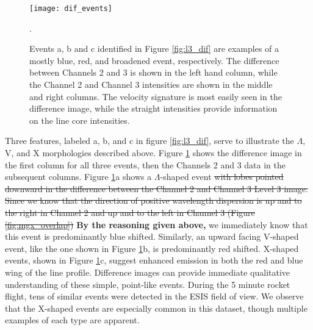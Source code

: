    	
 		\begin{figure}
  			\centering
  			\texttt{[image: dif\_events]}
  			\caption{Events a, b and c identified in Figure \ref{fig:l3_dif} are examples of a mostly blue, red, and broadened event, respectively. The difference between Channels 2 and 3 is shown in the left hand column, while the Channel 2 and Channel 3 intensities are shown in the middle and right columns.  The velocity signature is most easily seen in the difference image, while the straight intensities provide information on the line core intensities. 
  			}
  			\label{fig:dif_events}. 
  		\end{figure}

    	
    	Three features, labeled a, b, and c in figure \ref{fig:l3_dif}, serve to illustrate the $\Lambda$, V, and X morphologies described above.
    	Figure \ref{fig:dif_events} shows the difference image in the first column for all three events, then the Channels 2 and 3 data in the subsequent columns. 
    	Figure \ref{fig:dif_events}a shows a $\Lambda$-shaped event \sout{with lobes pointed downward in the difference between the Channel 2 and Channel 3 Level 3 image.
    	Since we know that the direction of positive wavelength dispersion is up and to the right in Channel 2 and up and to the left in Channel 3 (Figure \ref{fig:mgx_overlap})} \textbf{By the reasoning given above,} we immediately know that this event is predominantly blue shifted.  
    	Similarly, an upward facing V-shaped event, like the one shown in Figure \ref{fig:dif_events}b, is predominantly red shifted.
    	X-shaped events, shown in Figure \ref{fig:dif_events}c, suggest enhanced emission in both the red and blue wing of the line profile. 
    	Difference images can provide immediate qualitative understanding of these simple, point-like events.  
    	During the 5 minute rocket flight, tens of similar events were detected in the ESIS field of view.  
    	We observe that the X-shaped events are especially common in this dataset, though multiple examples of each 
    	type are apparent.
    	
